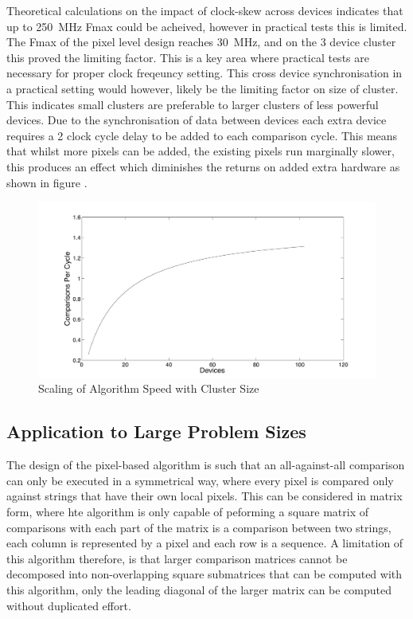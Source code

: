 \documentclass[conference]{IEEEtran}
\begin{document}
Theoretical calculations on the impact of clock-skew across devices indicates that up to 250~MHz Fmax could be acheived, however in practical tests this is limited. The Fmax of the pixel level design reaches 30~MHz, and on the 3 device cluster this proved the limiting factor. This is a key area where practical tests are necessary for proper clock freqeuncy setting. This cross device synchronisation in a practical setting would however, likely be the limiting factor on size of cluster. This indicates small clusters are preferable to larger clusters of less powerful devices.
Due to the synchronisation of data between devices each extra device requires a 2 clock cycle delay to be added to each comparison cycle. This means that whilst more pixels can be added, the existing pixels run marginally slower, this produces an effect which diminishes the returns on added extra hardware as shown in figure \cite{fig:scale}.




\begin{figure}[!h]
  \centering
  \includegraphics[width=0.9\columnwidth]{./figs/scalability.pdf}
  \caption{Scaling of Algorithm Speed with Cluster Size}
    \label{fig:scale}
\end{figure}


\subsection{Application to Large Problem Sizes}

The design of the pixel-based algorithm is such that an all-against-all comparison can only be executed in a symmetrical way, where every pixel is compared only against strings that have their own local pixels. This can be considered in matrix form, where hte algorithm is only capable of peforming a square matrix of comparisons with each part of the matrix is a comparison between two strings, each column is represented by a pixel and each row is a sequence. A limitation of this algorithm therefore, is that larger comparison matrices cannot be decomposed into non-overlapping square submatrices that can be computed with this algorithm, only the leading diagonal of the larger matrix can be computed without duplicated effort.
\end{document}
